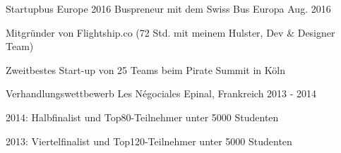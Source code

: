 

\begin{cventries}

  \cventry
    {Startupbus Europe 2016} %
    {Buspreneur mit dem Swiss Bus} %
    {Europa} %
    {Aug. 2016} %
    {
      \begin{cvitems} %
        \item {Mitgründer von Flightship.co (72 Std. mit meinem Hulster, Dev \& Designer Team)}
        \item {Zweitbestes Start-up von 25 Teams beim Pirate Summit in Köln}
      \end{cvitems}
    }

  \cventry
    {Verhandlungswettbewerb} %
    {Les Négociales} %
    {Epinal, Frankreich} %
    {2013 - 2014} %
    {
    	\begin{cvitems}
    	\item{2014: Halbfinalist und Top80-Teilnehmer unter 5000 Studenten}
    	\item{2013: Viertelfinalist und Top120-Teilnehmer unter 5000 Studenten}
    	\end{cvitems}
    }
\end{cventries}


